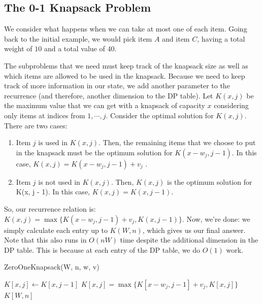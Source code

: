 \documentclass [12pt]{article}
\theoremstyle{definition}
\begin{document}
\subsection{The 0-1 Knapsack Problem}

We consider what happens when we can take at most one of each item. Going back to the initial example, we would pick item $A$ and item $C$, having a total weight of $10$ and a total value of $40$.

The subproblems that we need must keep track of the knapsack size as well as which items are allowed to be used in the knapsack. Because we need to keep track of more information in our state, we add another parameter to the recurrence (and therefore, another dimension to the DP table). Let $K(x, j)$ be the maximum value that we can get with a knapsack of capacity $x$ considering only items at indices from $1, \cdots , j$. Consider the optimal solution for $K(x, j)$. There are two cases: 

\begin{enumerate}
  \item Item $j$ is used in $K(x, j)$. Then, the remaining items that we choose to put in the knapsack must be the optimum solution for $K(x - w_j , j - 1)$. In this case, $K(x, j) = K(x - w_j , j - 1) + v_j$ .
  \item Item $j$ is not used in $K(x, j)$. Then, $K(x, j)$ is the optimum solution for K(x, j - 1). In this case, $K(x, j) = K(x, j - 1)$.
\end{enumerate}

So, our recurrence relation is: $K(x, j) = \max\{K(x -w_j , j -1) +v_j , K(x, j -1)\}$. Now, we’re done: we simply calculate each entry up to $K(W, n)$, which gives us our final answer. Note that this also runs in $O(nW)$ time despite the additional dimension in the DP table. This is because at each entry of the DP table, we do $O(1)$ work.

\begin{algorithm}
\caption{ZeroOneKnapsack(W, n, w, v)}
\label{alg:zerooneknapsack}
\begin{algorithmic}
\State {}
\State {}
\State {} {
  \State {} {
    \State $K[x, j] \gets K[x, j-1]$
    \State {} {
        $K[x, j] = \max\{K[x - w_j, j-1] + v_j, K[x, j] \}$
    }
  }
}
\State \Return $K[W, n]$
\end{algorithmic}
\end{algorithm}
\end{document}
